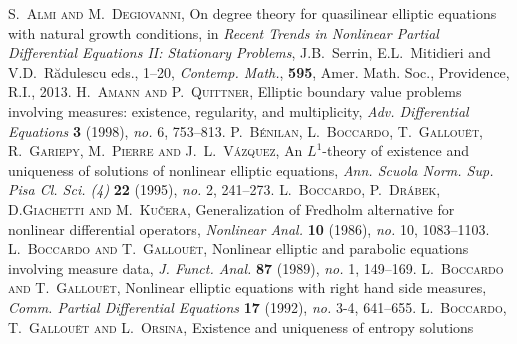 \documentclass[twoside,reqno]{amsart}
\numberwithin{equation}{section}
\theoremstyle{definition}
\newcommand{\au}[1]{\textsc{#1}}
\newcommand{\titleart}[1]{\textrm{#1}}
\newcommand{\jour}[1]{\textit{#1}}
\newcommand{\volart}[1]{\textbf{#1}}
\newcommand{\no}[1]{\textit{no.} {#1}}
\begin{document}
\begin{thebibliography}{99}
%
\au{S.~Almi and M.~Degiovanni},
On degree theory for quasilinear elliptic equations with natural
growth conditions, 
in \textit{Recent Trends in Nonlinear Partial Differential 
Equations II: Stationary Problems},
J.B.~Serrin, E.L.~Mitidieri and V.D.~R\u{a}dulescu eds., 1--20,
\textit{Contemp. Math.}, \textbf{595}, 
Amer. Math. Soc., Providence, R.I., 2013.
%
\au{H.~Amann and P.~Quittner},
\titleart{Elliptic boundary value problems involving measures:
existence, regularity, and multiplicity},
\jour{Adv. Differential Equations} \volart{3} (1998),
\no{6}, 753--813.
%
%
%
\au{P.~B{\'e}nilan, L.~Boccardo, T.~Gallou{\"e}t, R.~Gariepy, 
M.~Pierre and J.~L.~V{\'a}zquez},
\titleart{An {$L^1$}-theory of existence and uniqueness of 
solutions of nonlinear elliptic equations},
\jour{Ann. Scuola Norm. Sup. Pisa Cl. Sci. (4)} \volart{22}
(1995), \no{2}, 241--273.
%
\au{L.~Boccardo, P.~Dr{\'a}bek, D.Giachetti and M.~Ku{\v{c}}era},
\titleart{Generalization of {F}redholm alternative for nonlinear
differential operators},
\jour{Nonlinear Anal.} \volart{10} (1986),
\no{10}, 1083--1103.
%
\au{L.~Boccardo and T.~Gallou{\"e}t},
\titleart{Nonlinear elliptic and parabolic equations 
involving measure data},
\jour{J. Funct. Anal.} \volart{87} (1989),
\no{1}, 149--169.
%
\au{L.~Boccardo and T.~Gallou{\"e}t}, 
\titleart{Nonlinear elliptic equations with right hand 
side measures}, 
\jour{Comm. Partial Differential Equations} \volart{17} 
(1992), \no{3-4}, 641--655.
%
%
\au{L.~Boccardo, T.~Gallou{\"e}t and L.~Orsina},
\titleart{Existence and uniqueness of entropy solutions 
}
\end{thebibliography}
\end{document}
